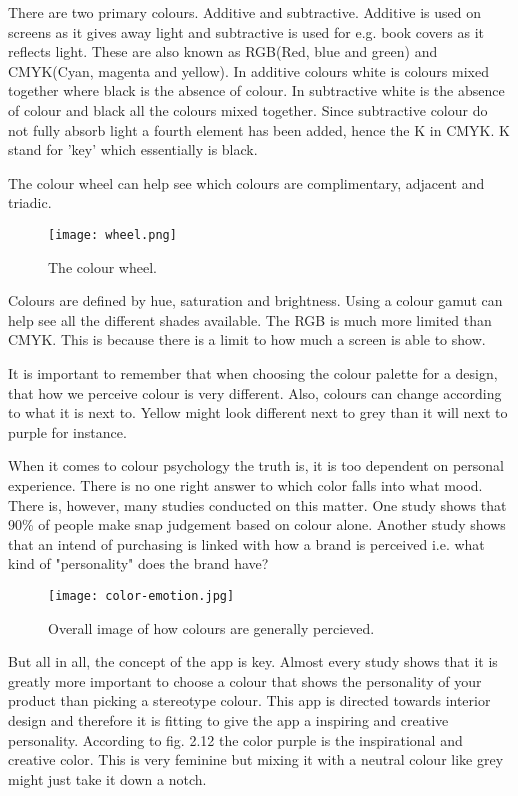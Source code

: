 There are two primary colours. Additive and subtractive. Additive is used on screens as it gives away light and subtractive is used for e.g. book covers as it reflects light. \cite{Colour}
These are also known as RGB(Red, blue and green) and CMYK(Cyan, magenta and yellow).
In additive colours white is colours mixed together where black is the absence of colour. In subtractive white is the absence of colour and black all the colours mixed together. 
Since subtractive colour do not fully absorb light a fourth element has been added, hence the K in CMYK. K stand for 'key' which essentially is black.\cite{Colour}

The colour wheel can help see which colours are complimentary, adjacent and triadic. 
\begin{figure}[H]
\centering
\texttt{[image: wheel.png]}
\caption{The colour wheel. \cite{Colour}}
\end{figure}

Colours are defined by hue, saturation and brightness. 
Using a colour gamut can help see all the different shades available. The RGB is much more limited than CMYK. This is because there is a limit to how much a screen is able to show. 

It is important to remember that when choosing the colour palette for a design, that how we perceive colour is very different. Also, colours can change according to what it is next to. Yellow might look different next to grey than it will next to purple for instance. \cite{Colour}

When it comes to colour psychology the truth is, it is too dependent on personal experience. There is no one right answer to which color falls into what mood. \cite{ColorMeaning}
There is, however, many studies conducted on this matter. 
One study shows that 90\% of people make snap judgement based on colour alone. \cite{ColorMeaning} Another study shows that an intend of purchasing is linked with how a brand is perceived i.e. what kind of "personality" does the brand have?\cite{ColorMeaning}

\begin{figure}[H]
\centering
\texttt{[image: color-emotion.jpg]}
\caption{Overall image of how colours are generally percieved. \cite{ColorMeaning}}
\end{figure}

But all in all, the concept of the app is key. Almost every study shows that it is greatly more important to choose a colour that shows the personality of your product than picking a stereotype colour. \cite{ColorMeaning} This app is directed towards interior design and therefore it is fitting to give the app a inspiring and creative personality. According to fig. 2.12 the color purple is the inspirational and creative color. This is very feminine but mixing it with a neutral colour like grey might just take it down a notch. 

